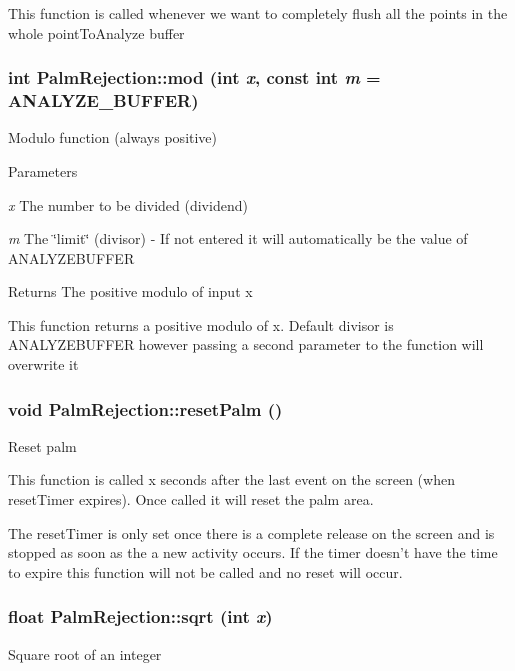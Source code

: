 This function is called whenever we want to completely flush all the points in the whole pointToAnalyze buffer \hypertarget{classPalmRejection_acecee9d679d22637d219a55d6db2421f}{
\subsubsection[{mod}]{\setlength{\rightskip}{0pt plus 5cm}int PalmRejection::mod (int {\em x}, \/  const int {\em m} = {\ttfamily ANALYZE\_\-BUFFER})}}
\label{classPalmRejection_acecee9d679d22637d219a55d6db2421f}
Modulo function (always positive) 
\begin{DoxyParams}{Parameters}
\item[{\em x}]The number to be divided (dividend) \item[{\em m}]The \char`\"{}limit\char`\"{} (divisor) -\/ If not entered it will automatically be the value of ANALYZEBUFFER\end{DoxyParams}
\begin{DoxyReturn}{Returns}
The positive modulo of input x
\end{DoxyReturn}
This function returns a positive modulo of x. Default divisor is ANALYZEBUFFER however passing a second parameter to the function will overwrite it \hypertarget{classPalmRejection_ae82ede159f4d99bad07924c3fb1387ee}{
\subsubsection[{resetPalm}]{\setlength{\rightskip}{0pt plus 5cm}void PalmRejection::resetPalm ()}}
\label{classPalmRejection_ae82ede159f4d99bad07924c3fb1387ee}
Reset palm

This function is called x seconds after the last event on the screen (when resetTimer expires). Once called it will reset the palm area.

The resetTimer is only set once there is a complete release on the screen and is stopped as soon as the a new activity occurs. If the timer doesn't have the time to expire this function will not be called and no reset will occur. \hypertarget{classPalmRejection_aa9a6e18b77805ae5cc32e56896191c20}{
\subsubsection[{sqrt}]{\setlength{\rightskip}{0pt plus 5cm}float PalmRejection::sqrt (int {\em x})}}
\label{classPalmRejection_aa9a6e18b77805ae5cc32e56896191c20}
Square root of an integer



